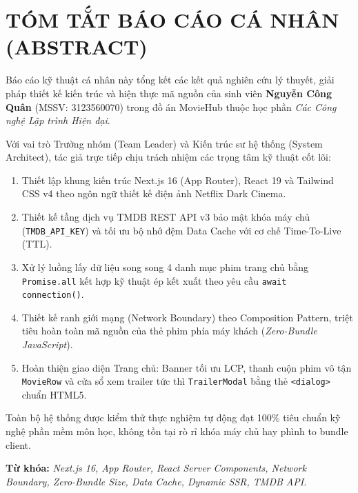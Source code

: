 \documentclass[12pt,a4paper]{extarticle}
\begin{document}
\newpage
{}
\setcounter{page}{2}

\section*{TÓM TẮT BÁO CÁO CÁ NHÂN (ABSTRACT)}

Báo cáo kỹ thuật cá nhân này tổng kết các kết quả nghiên cứu lý thuyết, giải pháp thiết kế kiến trúc và hiện thực mã nguồn của sinh viên \textbf{Nguyễn Công Quân} (MSSV: 3123560070) trong đồ án MovieHub thuộc học phần \textit{Các Công nghệ Lập trình Hiện đại}.

Với vai trò Trưởng nhóm (Team Leader) và Kiến trúc sư hệ thống (System Architect), tác giả trực tiếp chịu trách nhiệm các trọng tâm kỹ thuật cốt lõi:
\begin{enumerate}
    \item Thiết lập khung kiến trúc Next.js 16 (App Router), React 19 và Tailwind CSS v4 theo ngôn ngữ thiết kế điện ảnh Netflix Dark Cinema.
    \item Thiết kế tầng dịch vụ TMDB REST API v3 bảo mật khóa máy chủ (\texttt{TMDB\_API\_KEY}) và tối ưu bộ nhớ đệm Data Cache với cơ chế Time-To-Live (TTL).
    \item Xử lý luồng lấy dữ liệu song song 4 danh mục phim trang chủ bằng \texttt{Promise.all} kết hợp kỹ thuật ép kết xuất theo yêu cầu \texttt{await connection()}.
    \item Thiết kế ranh giới mạng (Network Boundary) theo Composition Pattern, triệt tiêu hoàn toàn mã nguồn của thẻ phim phía máy khách (\textit{Zero-Bundle JavaScript}).
    \item Hoàn thiện giao diện Trang chủ: Banner tối ưu LCP, thanh cuộn phim vô tận \texttt{MovieRow} và cửa sổ xem trailer tức thì \texttt{TrailerModal} bằng thẻ \texttt{<dialog>} chuẩn HTML5.
\end{enumerate}

Toàn bộ hệ thống được kiểm thử thực nghiệm tự động đạt 100\% tiêu chuẩn kỹ nghệ phần mềm môn học, không tồn tại rò rỉ khóa máy chủ hay phình to bundle client.

\vspace{0.3cm}
\noindent \textbf{Từ khóa:} \textit{Next.js 16, App Router, React Server Components, Network Boundary, Zero-Bundle Size, Data Cache, Dynamic SSR, TMDB API.}
\end{document}
